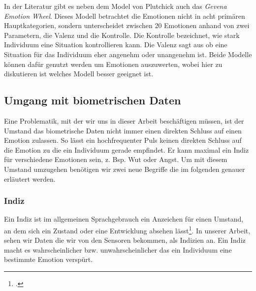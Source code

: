 In der Literatur gibt es neben dem Model von Plutchick auch das \textit{Gevena Emotion Wheel}. Dieses Modell betrachtet die Emotionen nicht in acht primären Hauptkategorien, sondern unterscheidet zwischen 20 Emotionen anhand von zwei Parametern, die Valenz und die Kontrolle. Die Kontrolle bezeichnet, wie stark Individuum eine Situation kontrollieren kann. Die Valenz sagt aus ob eine Situation für das Individuum eher angenehm oder unangenehm ist. 
Beide Modelle können dafür genutzt werden um Emotionen auszuwerten, wobei hier zu diskutieren ist welches Modell besser geeignet ist.
\subsection{Umgang mit biometrischen Daten}
Eine Problematik, mit der wir uns in dieser Arbeit beschäftigen müssen, ist der Umstand das biometrische Daten nicht immer einen direkten Schluss auf einen Emotion zulassen. So lässt ein hochfrequenter Puls keinen direkten Schluss auf die Emotion zu die ein Individuum gerade empfindet. Er kann maximal ein Indiz für verschiedene Emotionen sein, z. Bsp. Wut oder Angst. Um mit diesem Umstand umzugehen benötigen wir zwei neue Begriffe die im folgenden genauer erläutert werden. 
\subsubsection{Indiz}
Ein Indiz ist im allgemeinen Sprachgebrauch ein Anzeichen für einen Umstand, an dem sich ein Zustand oder eine Entwicklung absehen lässt\footcite[Vgl.][]{Dud18}. In unserer Arbeit, sehen wir Daten die wir von den Sensoren bekommen, als Indizien an. Ein Indiz macht es wahrscheinlicher bzw. unwahrscheinlicher das ein Individuum eine bestimmte Emotion verspürt. 
